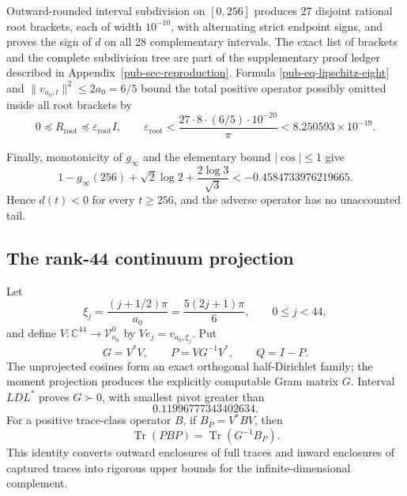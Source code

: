 \documentclass[11pt]{article}
\theoremstyle{remark}
\DeclareMathOperator{\Tr}{Tr}
\begin{document}
Outward-rounded interval subdivision on \([0,256]\) produces 27 disjoint rational root brackets,
each of width \(10^{-10}\), with alternating strict endpoint signs,
and proves the sign of \(d\) on all 28 complementary intervals.
The exact list of brackets and the complete subdivision tree are part of the supplementary proof ledger described in Appendix~\ref{pub-sec-reproduction}.
Formula \eqref{pub-eq-lipschitz-eight} and \(\lVert v_{a_0,t}\rVert^2\leq2a_0=6/5\) bound the total positive operator possibly omitted inside all root brackets by
\begin{equation}
 0\preceq R_{\mathrm{root}}\preceq
 \varepsilon_{\mathrm{root}}I,
 \qquad
 \varepsilon_{\mathrm{root}}<
 \frac{27\cdot8\cdot(6/5)\cdot10^{-20}}{\pi}
 <8.250593\times10^{-19}.
\label{pub-eq-root-charge}
\end{equation}

Finally, monotonicity of \(g_\infty\) and the elementary bound \(|\cos|\leq1\) give
\begin{equation}
 1-g_\infty(256)+\sqrt2\log2+\frac{2\log3}{\sqrt3}
 <-0.4584733976219665.
\label{pub-eq-tail-sign}
\end{equation}
Hence \(d(t)<0\) for every \(t\geq256\), and the adverse operator has no unaccounted tail.

\subsection{The rank-44 continuum projection}

Let
\begin{equation}
 \xi_j=\frac{(j+1/2)\pi}{a_0}
      =\frac{5(2j+1)\pi}{6},
 \qquad 0\leq j<44,
\label{pub-eq-feature-frequencies}
\end{equation}
and define \(V:\mathbb C^{44}\to\mathcal V_{a_0}^0\) by \(Ve_j=v_{a_0,\xi_j}\).
Put
\begin{equation}
 G=V^*V,
 \qquad P=VG^{-1}V^*,
 \qquad Q=I-P.
\label{pub-eq-proof-projection}
\end{equation}
The unprojected cosines form an exact orthogonal half-Dirichlet family;
the moment projection produces the explicitly computable Gram matrix \(G\).
Interval \(LDL^*\) proves \(G\succ0\), with smallest pivot greater than
\begin{equation}
                   0.11996777343402634.
\label{pub-eq-gram-pivot}
\end{equation}
For a positive trace-class operator \(B\), if \(B_P=V^*BV\), then
\begin{equation}
              \Tr(PBP)=
              \Tr(G^{-1}B_P).
\label{pub-eq-captured-trace}
\end{equation}
This identity converts outward enclosures of full traces and inward enclosures of captured traces into rigorous upper bounds for the infinite-dimensional complement.
\end{document}
